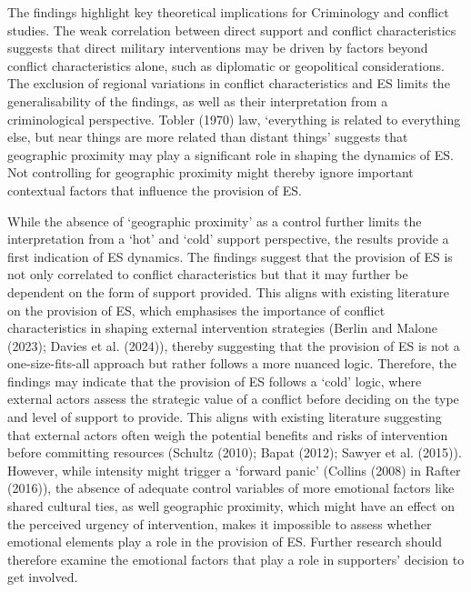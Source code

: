 \documentclass[
]{article}
\begin{document}
The findings highlight key theoretical implications for Criminology and
conflict studies. The weak correlation between direct support and
conflict characteristics suggests that direct military interventions may
be driven by factors beyond conflict characteristics alone, such as
diplomatic or geopolitical considerations. The exclusion of regional
variations in conflict characteristics and ES limits the
generalisability of the findings, as well as their interpretation from a
criminological perspective. Tobler (1970) law, `everything is related to
everything else, but near things are more related than distant things'
suggests that geographic proximity may play a significant role in
shaping the dynamics of ES. Not controlling for geographic proximity
might thereby ignore important contextual factors that influence the
provision of ES.

While the absence of `geographic proximity' as a control further limits
the interpretation from a `hot' and `cold' support perspective, the
results provide a first indication of ES dynamics. The findings suggest
that the provision of ES is not only correlated to conflict
characteristics but that it may further be dependent on the form of
support provided. This aligns with existing literature on the provision
of ES, which emphasises the importance of conflict characteristics in
shaping external intervention strategies (Berlin and Malone (2023);
Davies et al. (2024)), thereby suggesting that the provision of ES is
not a one-size-fits-all approach but rather follows a more nuanced
logic. Therefore, the findings may indicate that the provision of ES
follows a `cold' logic, where external actors assess the strategic value
of a conflict before deciding on the type and level of support to
provide. This aligns with existing literature suggesting that external
actors often weigh the potential benefits and risks of intervention
before committing resources (Schultz (2010); Bapat (2012); Sawyer et al.
(2015)). However, while intensity might trigger a `forward panic'
(Collins (2008) in Rafter (2016)), the absence of adequate control
variables of more emotional factors like shared cultural ties, as well
geographic proximity, which might have an effect on the perceived
urgency of intervention, makes it impossible to assess whether emotional
elements play a role in the provision of ES. Further research should
therefore examine the emotional factors that play a role in supporters'
decision to get involved.
\end{document}
